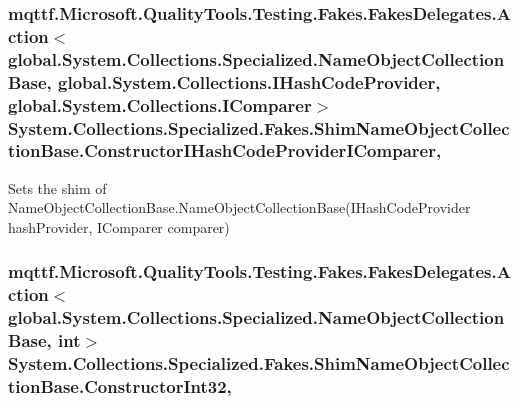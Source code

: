 \hypertarget{class_system_1_1_collections_1_1_specialized_1_1_fakes_1_1_shim_name_object_collection_base_a2ef44c9a5146ae87a5c88b536f427b93}{
\subsubsection[{Constructor\-I\-Hash\-Code\-Provider\-I\-Comparer}]{\setlength{\rightskip}{0pt plus 5cm}mqttf.\-Microsoft.\-Quality\-Tools.\-Testing.\-Fakes.\-Fakes\-Delegates.\-Action$<$global.\-System.\-Collections.\-Specialized.\-Name\-Object\-Collection\-Base, global.\-System.\-Collections.\-I\-Hash\-Code\-Provider, global.\-System.\-Collections.\-I\-Comparer$>$ System.\-Collections.\-Specialized.\-Fakes.\-Shim\-Name\-Object\-Collection\-Base.\-Constructor\-I\-Hash\-Code\-Provider\-I\-Comparer\hspace{0.3cm}{\ttfamily [static]}, {\ttfamily [set]}}}\label{class_system_1_1_collections_1_1_specialized_1_1_fakes_1_1_shim_name_object_collection_base_a2ef44c9a5146ae87a5c88b536f427b93}


Sets the shim of Name\-Object\-Collection\-Base.\-Name\-Object\-Collection\-Base(\-I\-Hash\-Code\-Provider hash\-Provider, I\-Comparer comparer)

\hypertarget{class_system_1_1_collections_1_1_specialized_1_1_fakes_1_1_shim_name_object_collection_base_aaede6d3c8b029b6d347c26a8aa60944c}{
\subsubsection[{Constructor\-Int32}]{\setlength{\rightskip}{0pt plus 5cm}mqttf.\-Microsoft.\-Quality\-Tools.\-Testing.\-Fakes.\-Fakes\-Delegates.\-Action$<$global.\-System.\-Collections.\-Specialized.\-Name\-Object\-Collection\-Base, int$>$ System.\-Collections.\-Specialized.\-Fakes.\-Shim\-Name\-Object\-Collection\-Base.\-Constructor\-Int32\hspace{0.3cm}{\ttfamily [static]}, {\ttfamily [set]}}}\label{class_system_1_1_collections_1_1_specialized_1_1_fakes_1_1_shim_name_object_collection_base_aaede6d3c8b029b6d347c26a8aa60944c}



